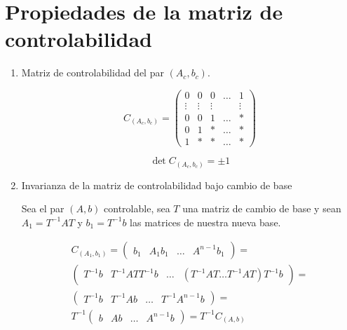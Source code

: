     \section{Propiedades de la matriz de controlabilidad}

        \begin{enumerate}
            \item Matriz de controlabilidad del par $(A_c, b_c)$.

                \begin{equation}
                    C_{(A_c,b_c)} =
                    \begin{pmatrix}
                    0 & 0 & 0 & \dots & 1 \\
                    \vdots & \vdots & \vdots & & \vdots \\
                    0 & 0 & 1 & \dots & * \\
                    0 & 1 & * & \dots & * \\
                    1 & * & * & \dots & *
                    \end{pmatrix}
                \end{equation}

                \begin{equation}
                    \det{C_{(A_c, b_c)}} = \pm 1
                \end{equation}

            \item Invarianza de la matriz de controlabilidad bajo cambio de base

                Sea el par $(A, b)$ controlable, sea $T$ una matriz de cambio de base y sean $A_1 = T^{-1} A T$ y $b_1 = T^{-1} b$ las matrices de nuestra nueva base.

                \begin{multline}
                C_{(A_1, b_1)} =
                \begin{pmatrix}
                b_1 & A_1 b_1 & \dots & A^{n-1} b_1
                \end{pmatrix} = \\
                \begin{pmatrix}
                T^{-1} b & T^{-1} A T T^{-1} b & \dots & (T^{-1} A T \dots T^{-1} A T) T^{-1} b
                \end{pmatrix} = \\
                \begin{pmatrix}
                T^{-1} b & T^{-1} A b & \dots & T^{-1} A^{n-1} b
                \end{pmatrix} = \\
                T^{-1}
                \begin{pmatrix}
                b & A b & \dots & A^{n-1} b
                \end{pmatrix} =
                T^{-1} C_{(A, b)} \nonumber
                \end{multline}


\end{enumerate}
